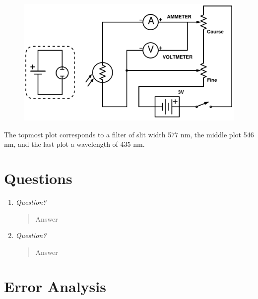 \documentclass{amsart}
\begin{document}
\begin{table}[H]
\begin{minipage}{.5\textwidth}
\end{minipage}
\end{table}

\begin{figure}
    \begin{minipage}{.45\textwidth}
        \includegraphics[width=\textwidth]{schematic.png}
    \end{minipage}
    \begin{minipage}{.45\textwidth}

    \end{minipage}
\end{figure}

The topmost plot corresponds to a filter of slit width 577 nm, the middle plot 546 nm, and the last plot a wavelength of 435 nm.
\section{Questions}

\begin{enumerate}
    \item {\textit{Question?}
\begin{quote}
Answer
\end{quote}}

\item{\textit{Question?}
\begin{quote}
Answer
\end{quote}}

\end{enumerate}

\section{Error Analysis}
\end{document}
